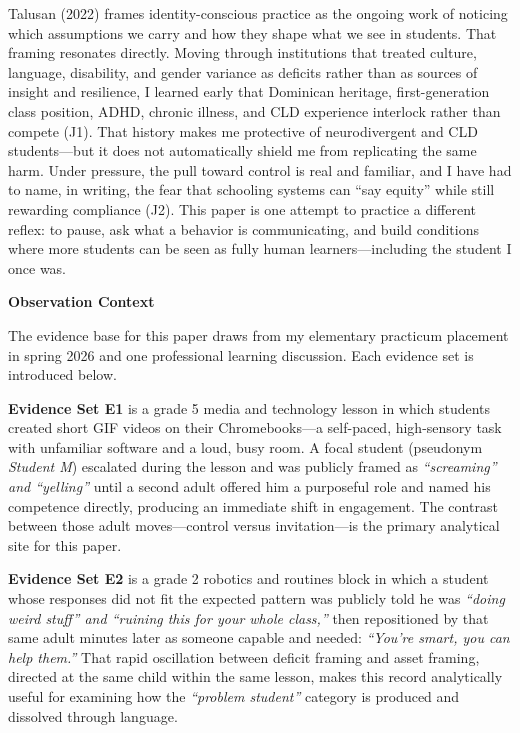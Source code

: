 \documentclass[12pt]{article}
\newcommand{\apaheading}[1]{\begin{center}\textbf{#1}\end{center}}
\newcommand{\EvidenceSet}[1]{\textsc{E#1}}
\newcommand{\JournalArtifact}[1]{\textsc{J#1}}
\begin{document}
Talusan (2022) frames identity-conscious practice as the ongoing work of noticing which assumptions we carry and how they shape what we see in students. That framing resonates directly. Moving through institutions that treated culture, language, disability, and gender variance as deficits rather than as sources of insight and resilience, I learned early that Dominican heritage, first-generation class position, ADHD, chronic illness, and CLD experience interlock rather than compete (\JournalArtifact{1}). That history makes me protective of neurodivergent and CLD students---but it does not automatically shield me from replicating the same harm. Under pressure, the pull toward control is real and familiar, and I have had to name, in writing, the fear that schooling systems can ``say equity'' while still rewarding compliance (\JournalArtifact{2}). This paper is one attempt to practice a different reflex: to pause, ask what a behavior is communicating, and build conditions where more students can be seen as fully human learners---including the student I once was.

\newpage
\apaheading{Observation Context}

The evidence base for this paper draws from my elementary practicum placement in spring 2026 and one professional learning discussion. Each evidence set is introduced below.

\textbf{Evidence Set \EvidenceSet{1}} is a grade 5 media and technology lesson in which students created short GIF videos on their Chromebooks---a self-paced, high-sensory task with unfamiliar software and a loud, busy room. A focal student (pseudonym \textit{Student M}) escalated during the lesson and was publicly framed as \textit{``screaming'' and ``yelling''} until a second adult offered him a purposeful role and named his competence directly, producing an immediate shift in engagement. The contrast between those adult moves---control versus invitation---is the primary analytical site for this paper.

\textbf{Evidence Set \EvidenceSet{2}} is a grade 2 robotics and routines block in which a student whose responses did not fit the expected pattern was publicly told he was \textit{``doing weird stuff'' and ``ruining this for your whole class,''} then repositioned by that same adult minutes later as someone capable and needed: \textit{``You're smart, you can help them.''} That rapid oscillation between deficit framing and asset framing, directed at the same child within the same lesson, makes this record analytically useful for examining how the \textit{``problem student''} category is produced and dissolved through language.
\end{document}
